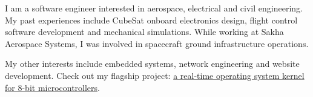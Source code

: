 \documentclass[letter,10pt]{article}
\begin{document}
    \begin{justify}
        I am a software engineer interested in aerospace, electrical and civil engineering. My past experiences include CubeSat onboard electronics design, flight control software development and mechanical simulations. While working at Sakha Aerospace Systems, I was involved in spacecraft ground infrastructure operations.
        \setlength{\parskip}{1em}
        \setlength{\parindent}{0em}

        My other interests include embedded systems, network engineering and website development. Check out my flagship project: \href{https://github.com/cansat-ptl/cubesat-rtos}{a real-time operating system kernel for 8-bit microcontrollers}.
    \end{justify}
\end{document}
